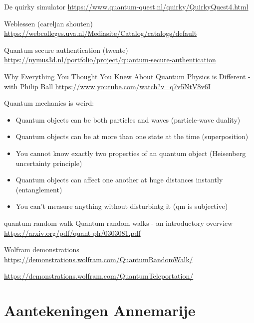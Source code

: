 \documentclass[../../main.tex]{subfiles}
\begin{document}
{De quirky simulator 
\url{https://www.quantum-quest.nl/quirky/QuirkyQuest4.html}

Weblessen (careljan shouten)
\url{https://webcolleges.uva.nl/Mediasite/Catalog/catalogs/default}

Quantum secure authentication (twente)
\url{https://nymus3d.nl/portfolio/project/quantum-secure-authentication}


Why Everything You Thought You Knew About Quantum Physics is Different - with Philip Ball
\url{https://www.youtube.com/watch?v=q7v5NtV8v6I}

Quantum mechanics is weird:
\begin{itemize}
\item Quantum objects can be both particles and waves (particle-wave duality)
\item Quantum objects can be at more than one state at the time (superposition)
\item You cannot know exactly two properties of an quantum object (Heisenberg uncertainty principle)

\item Quantum objects can affect one another at huge distances instantly (entanglement)
\item You can't measure anything without disturbintg it (qm is subjective)
\end{itemize}

quantum random walk Quantum random walks - an introductory overview
\url{https://arxiv.org/pdf/quant-ph/0303081.pdf}

Wolfram demonstrations
\url{https://demonstrations.wolfram.com/QuantumRandomWalk/}

\url{https://demonstrations.wolfram.com/QuantumTeleportation/}


\section*{Aantekeningen Annemarije}

}
\end{document}
